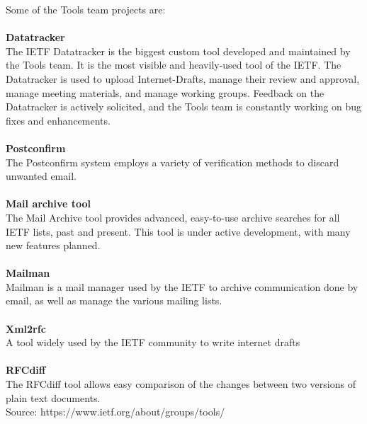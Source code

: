 \documentclass[a4paper,english]{report}
\begin{document}
Some of the Tools team projects are: \\\\
\textbf{Datatracker}\\
The IETF Datatracker is the biggest custom tool developed and maintained by the Tools team. It is the most visible and heavily-used tool of the IETF. The Datatracker is used to upload Internet-Drafts, manage their review and approval, manage meeting materials, and manage working groups. Feedback on the Datatracker is actively solicited, and the Tools team is constantly working on bug fixes and enhancements.\\
\\\textbf{Postconfirm}\\
The Postconfirm system employs a variety of verification methods to discard unwanted email.\\
\\\textbf{Mail archive tool}\\
The Mail Archive tool provides advanced, easy-to-use archive searches for all IETF lists, past and present. This tool is under active development, with many new features planned.\\
\\\textbf{Mailman}\\
Mailman is a mail manager used by the IETF to archive communication done by email, as well as manage the various mailing lists.\\
\\\textbf{Xml2rfc}\\
A tool widely used by the IETF community to write internet drafts \\
\\\textbf{RFCdiff}\\
The RFCdiff tool allows easy comparison of the changes between two versions of plain text documents.\\

Source: https://www.ietf.org/about/groups/tools/
\end{document}
